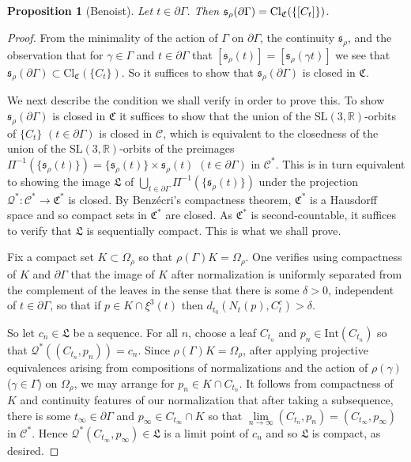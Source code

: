 \documentclass[12pt,a4paper]{amsart}
\newcommand{\bbR}{\mathbb R}
\theoremstyle{definition}
\theoremstyle{plain}
\newtheorem{proposition}[theorem]{Proposition}
\numberwithin{equation}{section}
\begin{document}
 \begin{proposition}[Benoist]\label{image-closed}
    Let $t \in \partial \Gamma$. Then $\mathfrak{s}_\rho(\partial \Gamma) = {\rm{Cl}}_\mathfrak{C}(\{[C_t]\})$.
\end{proposition}

\begin{proof}
    From the minimality of the action of $\Gamma$ on $\partial \Gamma$, the continuity $\mathfrak{s}_\rho$, and the observation that for $\gamma \in \Gamma$ and $t \in \partial \Gamma$ that $[\mathfrak{s}_\rho(t)] = [\mathfrak{s}_\rho(\gamma t)]$ we see that $\mathfrak{s}_\rho(\partial \Gamma) \subset \text{Cl}_{\mathfrak{C}}(\{C_t\})$. So it suffices to show that $\mathfrak{s}_\rho(\partial \Gamma)$ is closed in $\mathfrak{C}$.
    
    We next describe the condition we shall verify in order to prove this. To show $\mathfrak{s}_\rho(\partial \Gamma)$ is closed in $\mathfrak{C}$ it suffices to show that the union of the $\text{SL}(3,\mathbb{R})$-orbits of $\{C_t \}$ $(t \in \partial \Gamma)$ is closed in $\mathcal{C}$, which is equivalent to the closedness of the union of the $\text{SL}(3,\bbR)$-orbits of the preimages $\Pi^{-1}(\{\mathfrak{s}_\rho(t) \}) = \{\mathfrak{s}_\rho(t) \} \times \mathfrak{s}_\rho(t)$ $(t \in \partial \Gamma)$ in $\mathcal{C}^*$. This is in turn equivalent to showing the image $\mathfrak{L}$ of $\bigcup_{t\in \partial \Gamma} \Pi^{-1}(\{\mathfrak{s}_\rho(t) \})$ under the projection $\mathcal{Q}^*: \mathcal{C}^* \to \mathfrak{C}^*$ is closed. By Benz\'ecri's compactness theorem, $\mathfrak{C}^*$ is a Hausdorff space and so compact sets in $\mathfrak{C}^*$ are closed. As $\mathfrak{C}^*$ is second-countable, it suffices to verify that $\mathfrak{L}$ is sequentially compact. This is what we shall prove.

    Fix a compact set $K \subset \Omega_\rho$ so that $\rho(\Gamma) K = \Omega_\rho$. One verifies using compactness of $K$ and $\partial \Gamma$ that the image of $K$ after normalization is uniformly separated from the complement of the leaves in the sense that there is some $\delta > 0$, independent of $t \in \partial \Gamma$, so that if $p \in K \cap \xi^3(t)$ then $d_{t_0}(N_t(p), C_t^c) > \delta$.

    So let $c_n \in \mathfrak{L}$ be a sequence. For all $n$, choose a leaf $C_{t_n}$ and $p_n \in \text{Int}(C_{t_n})$ so that $\mathcal{Q}^*((C_{t_n}, p_n)) = c_n$. Since $\rho(\Gamma)K = \Omega_\rho$, after applying projective equivalences arising from compositions of normalizations and the action of $\rho(\gamma)$ ($\gamma \in \Gamma$) on $\Omega_\rho$, we may arrange for $p_n \in K \cap C_{t_n}$. It follows from compactness of $K$ and continuity features of our normalization that after taking a subsequence, there is some $t_\infty \in \partial \Gamma$ and $p_\infty \in C_{t_\infty} \cap K$ so that $\lim\limits_{n \to \infty} (C_{t_n}, p_n) = (C_{t_\infty}, p_\infty)$ in $\mathcal{C}^*$. Hence $\mathcal{Q}^*(C_{t_\infty}, p_\infty) \in \mathfrak{L}$ is a limit point of $c_n$ and so $\mathfrak{L}$ is compact, as desired.
\end{proof}
\end{document}
